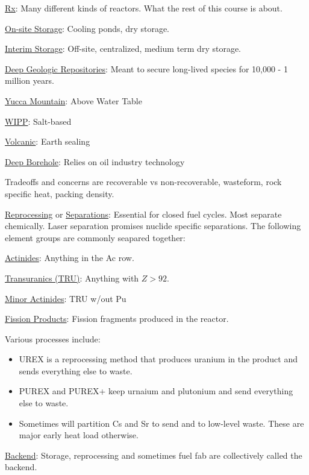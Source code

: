 \begin{labeling}
    \item [\underline{Rx}:] Many different kinds of reactors. What the rest of this course is about.
    \item [\underline{On-site Storage}:] Cooling ponds, dry storage.
    \item [\underline{Interim Storage}:] Off-site, centralized, medium term dry storage.
    \item [\underline{Deep Geologic Repositories}:] Meant to secure long-lived species for 10,000 - 1 million years.
        \begin{labeling}
            \item [\underline{Yucca Mountain}:] Above Water Table
            \item [\underline{WIPP}:] Salt-based
            \item [\underline{Volcanic}:] Earth sealing
            \item [\underline{Deep Borehole}:] Relies on oil industry technology
        \end{labeling}
        Tradeoffs and concerns are recoverable vs non-recoverable, wasteform, rock specific heat, packing density.
    \item [\underline{Reprocessing} or \underline{Separations}:] Essential for closed fuel cycles. Most separate
        chemically. Laser separation promises nuclide specific separations. The following element groups are
        commonly seapared together:
        \begin{labeling}
            \item [\underline{Actinides}:] Anything in the Ac row.
            \item [\underline{Transuranics (TRU)}:] Anything with $Z > 92$.
            \item [\underline{Minor Actinides}:] TRU w/out Pu
            \item [\underline{Fission Products}:] Fission fragments produced in the reactor.
        \end{labeling}
        Various processes include:
        \begin{itemize}
            \item UREX is a reprocessing method that produces uranium in the product and sends everything
                else to waste.
            \item PUREX and PUREX+ keep urnaium and plutonium and send everything else to waste.
            \item Sometimes will partition Cs and Sr to send  and  to low-level waste. These are
                major early heat load otherwise.
        \end{itemize}
    \item [\underline{Backend}:] Storage, reprocessing and sometimes fuel fab are collectively called the backend.
\end{labeling}

